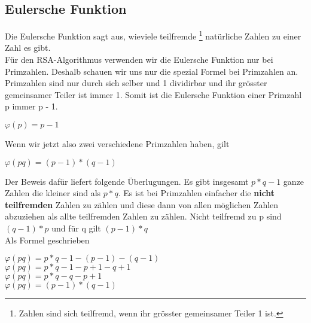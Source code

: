\subsection{Eulersche Funktion}
Die Eulersche Funktion sagt aus, wieviele teilfremde \footnote{Zahlen sind sich teilfremd, wenn ihr grösster gemeinsamer Teiler 1 ist.} natürliche Zahlen zu einer Zahl es gibt.\\
Für den RSA-Algorithmus verwenden wir die Eulersche Funktion nur bei Primzahlen. Deshalb schauen wir uns nur die spezial Formel bei Primzahlen an.\\
Primzahlen sind nur durch sich selber und 1 dividirbar und ihr grösster gemeinsamer Teiler ist immer 1. Somit ist die Eulersche Funktion einer Primzahl p immer p - 1.
\begin{center}
$ \varphi(p) = p - 1 $
\end{center}
Wenn wir jetzt also zwei verschiedene Primzahlen haben, gilt
\begin{center}
$ \varphi(pq) = (p - 1) * (q - 1) $
\end{center}
Der Beweis dafür liefert folgende Überlugungen. Es gibt insgesamt $ p * q -1 $ ganze Zahlen die kleiner sind als $ p * q $. Es ist bei Primzahlen einfacher die \textbf{nicht teilfremden} Zahlen zu zählen und diese dann von allen möglichen Zahlen abzuziehen als allte teilfremden Zahlen zu zählen. Nicht teilfremd zu p sind $ (q - 1) * p $ und für q gilt $ (p - 1) * q $\\
Als Formel geschrieben
\begin{center}
$ \varphi(pq) = p * q -1 - (p - 1) - (q - 1) $ \\
$ \varphi(pq) = p * q -1 - p + 1 - q + 1 $ \\
$ \varphi(pq) = p * q -q - p + 1 $ \\
$ \varphi(pq) = (p -1) * (q - 1) $ 
\end{center}
